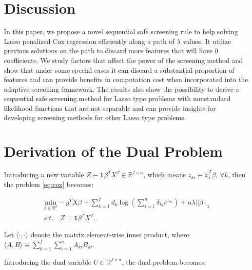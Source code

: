 \section{Discussion}

In this paper, we propose a novel sequential safe screening rule to help solving Lasso penalized Cox regression efficiently along a path of $\lambda$ values. It utilize previous solutions on the path to discard more features that will have 0 coefficients. We study factors that affect the power of the screening method and show that under some special cases it can discard a substantial proportion of features and can provide benefits in computation cost when incorporated into the adaptive screening framework. The results also show the possibility to derive a sequential safe screening method for Lasso type problems with nonstandard likelihood functions that are not separable and can provide insights for developing screening methods for other Lasso type problems.

\appendix
\appendixpage


\section{Derivation of the Dual Problem}


Introducing a new variable $Z\equiv\mathbf{1}\beta^TX^T\in\mathbb{R}^{f\times n}$, which means $z_{ki}\equiv\tilde{x}_i^T\beta,\,\forall k$, then the problem \eqref{eq:cox} becomes:

\begin{equation}
    \label{eq:dual+z}
    \begin{gathered}
    \underset{\beta\in \mathbb{R}^p}{\mathrm{min}}-y^TX\beta+\sum_{k=1}^f d_k\log\left(\sum_{i=1}^n \delta_{ki} e^{z_{ki}}\right)+n\lambda||\beta||_1\\s.t.\quad Z=\mathbf{1}\beta^TX^T.
\end{gathered}
\end{equation}

Let $\langle\cdot,\cdot\rangle$ denote the matrix element-wise inner product, where $\langle A,B \rangle\equiv\sum_{k=1}^f\sum_{i=1}^nA_{ki}B_{ki}$.

Introducing the dual variable $U\in\mathbb{R}^{f\times n}$, the dual problem becomes:

